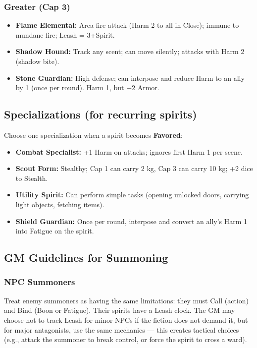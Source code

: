 \subsubsection{Greater (Cap 3)}

\begin{itemize}
  \item \textbf{Flame Elemental:} Area fire attack (Harm 2 to all in Close); immune to mundane fire; Leash = 3+Spirit.
  \item \textbf{Shadow Hound:} Track any scent; can move silently; attacks with Harm 2 (shadow bite).
  \item \textbf{Stone Guardian:} High defense; can interpose and reduce Harm to an ally by 1 (once per round). Harm 1, but +2 Armor.
\end{itemize}

\subsection{Specializations (for recurring spirits)}

Choose one specialization when a spirit becomes \textbf{Favored}:
\begin{itemize}
  \item \textbf{Combat Specialist:} +1 Harm on attacks; ignores first Harm 1 per scene.
  \item \textbf{Scout Form:} Stealthy; Cap 1 can carry 2 kg, Cap 3 can carry 10 kg; +2 dice to Stealth.
  \item \textbf{Utility Spirit:} Can perform simple tasks (opening unlocked doors, carrying light objects, fetching items).
  \item \textbf{Shield Guardian:} Once per round, interpose and convert an ally's Harm 1 into Fatigue on the spirit.
\end{itemize}

\subsection{GM Guidelines for Summoning}

\subsubsection{NPC Summoners}
Treat enemy summoners as having the same limitations: they must Call (action) and Bind (Boon or Fatigue). Their spirits have a Leash clock. The GM may choose not to track Leash for minor NPCs if the fiction does not demand it, but for major antagonists, use the same mechanics — this creates tactical choices (e.g., attack the summoner to break control, or force the spirit to cross a ward).

